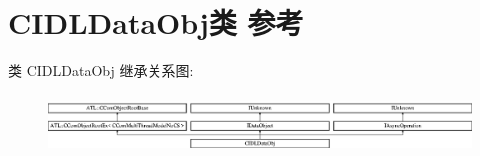 \hypertarget{class_c_i_d_l_data_obj}{}\section{C\+I\+D\+L\+Data\+Obj类 参考}
\label{class_c_i_d_l_data_obj}
类 C\+I\+D\+L\+Data\+Obj 继承关系图\+:\begin{figure}[H]
\begin{center}
\leavevmode
\includegraphics[height=1.590909cm]{class_c_i_d_l_data_obj}
\end{center}
\end{figure}
